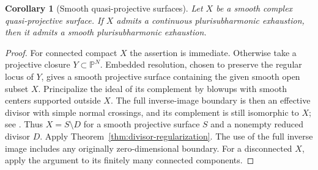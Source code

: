 \documentclass[11pt]{amsart}
\newtheorem{corollary}[theorem]{Corollary}
\theoremstyle{definition}
\theoremstyle{remark}
\numberwithin{equation}{section}
\begin{document}
\begin{corollary}[Smooth quasi-projective surfaces]
\label{cor:quasiprojective-regularization}
Let $X$ be a smooth complex quasi-projective surface.  If $X$
admits a continuous plurisubharmonic exhaustion, then it admits
a smooth plurisubharmonic exhaustion.
\end{corollary}

\begin{proof}
For connected compact $X$ the assertion is immediate.  Otherwise
take a projective closure $Y\subset\mathbb P^N$.  Embedded
resolution, chosen to preserve the regular locus of $Y$, gives a
smooth projective surface containing the given smooth open subset
$X$.  Principalize the ideal of its complement by blowups with
smooth centers supported outside $X$.  The full inverse-image
boundary is then an effective divisor with simple normal crossings,
and its complement is still isomorphic to $X$; see
\cite[Theorems~1.0.1--1.0.2]{Wlodarczyk05}.  Thus $X=S\setminus D$
for a smooth projective surface $S$ and a nonempty reduced divisor
$D$.  Apply Theorem~\ref{thm:divisor-regularization}.  The use of
the full inverse image includes any originally zero-dimensional
boundary.  For a disconnected $X$, apply the argument to its
finitely many connected components.
\end{proof}
\end{document}
